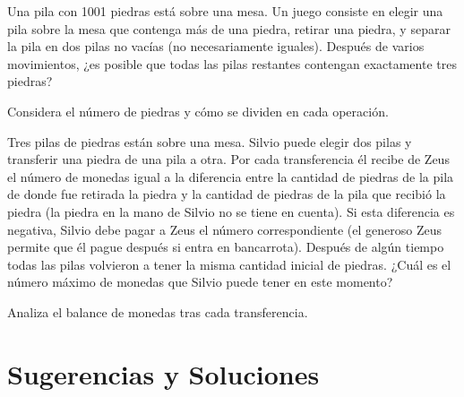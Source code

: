 \documentclass[11pt]{scrartcl}
\begin{document}
\begin{problem}[Leningrado 1988] Una pila con 1001 piedras está sobre una mesa. Un juego consiste en elegir una pila sobre la mesa que contenga más de una piedra, retirar una piedra, y separar la pila en dos pilas no vacías (no necesariamente iguales). Después de varios movimientos, ¿es posible que todas las pilas restantes contengan exactamente tres piedras?
\begin{hint}
Considera el número de piedras y cómo se dividen en cada operación.
\end{hint}
\end{problem}

\begin{problem}[Rusia 1995] Tres pilas de piedras están sobre una mesa. Silvio puede elegir dos pilas y transferir una piedra de una pila a otra. Por cada transferencia él recibe de Zeus el número de monedas igual a la diferencia entre la cantidad de piedras de la pila de donde fue retirada la piedra y la cantidad de piedras de la pila que recibió la piedra (la piedra en la mano de Silvio no se tiene en cuenta). Si esta diferencia es negativa, Silvio debe pagar a Zeus el número correspondiente (el generoso Zeus permite que él pague después si entra en bancarrota). Después de algún tiempo todas las pilas volvieron a tener la misma cantidad inicial de piedras. ¿Cuál es el número máximo de monedas que Silvio puede tener en este momento?
\begin{hint}
Analiza el balance de monedas tras cada transferencia.
\end{hint}
\end{problem}

\section{Sugerencias y Soluciones}
\begin{enumerate}

\end{enumerate}
\end{document}
